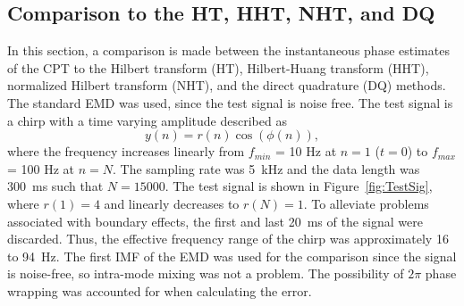 \documentclass[11pt,draftcls,onecolumn]{IEEEtran}
\begin{document}
\subsection{Comparison to the HT, HHT, NHT, and DQ}
In this section, a comparison is made between the instantaneous phase estimates of the CPT to the Hilbert transform (HT), Hilbert-Huang transform (HHT), normalized Hilbert transform (NHT), and the direct quadrature (DQ) methods. The standard EMD was used, since the test signal is noise free. The test signal is a chirp with a time varying amplitude described as
\begin{equation}\label{TestSigNoNoise}
    y(n)=r\left(n\right)\cos\left(\phi\left(n\right)\right),
\end{equation}
where the frequency increases linearly from $f_{min}$ = 10 Hz at $n=1$ ($t=0$) to $f_{max}$ = 100 Hz at $n=N$. The sampling rate was 5~kHz and the data length was 300~ms such that $N = 15000$. The test signal is shown in Figure~\ref{fig:TestSig}, where $r(1) = 4$ and linearly decreases to $r(N) = 1$. To alleviate problems associated with boundary effects, the first and last 20~ms of the signal were discarded. Thus, the effective frequency range of the chirp was approximately 16 to 94~Hz. The first IMF of the EMD was used for the comparison since the signal is noise-free, so intra-mode mixing was not a problem. The possibility of $2\pi$ phase wrapping was accounted for when calculating the error.
\end{document}
